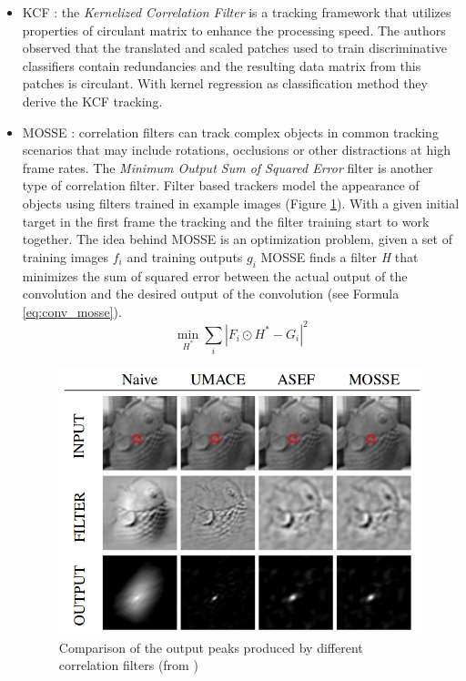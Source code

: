 \begin{itemize}
\item KCF \cite{henriques2012exploiting}: the \textit{Kernelized Correlation Filter} is a tracking framework that utilizes properties of circulant matrix to enhance the processing speed. The authors observed that the translated and scaled patches used to train discriminative classifiers contain redundancies and the resulting data matrix from this patches is circulant. With kernel regression as classification method they derive the KCF tracking.
\item MOSSE \cite{bolme2010visual}: correlation filters can track complex objects in common tracking scenarios that may include rotations, occlusions or other distractions at high frame rates. The \textit{Minimum Output Sum of Squared Error} filter is another type of correlation filter. Filter based trackers model the appearance of objects using filters trained in example images (Figure \ref{fig:mosse}). With a given initial target in the first frame the tracking and the filter training start to work together. The idea behind MOSSE is an optimization problem, given a set of training images $f_i$ and training outputs $g_i$ MOSSE finds a filter \textit{H} that minimizes the sum of squared error between the actual output of the convolution and the desired output of the convolution (see Formula \ref{eq:conv_mosse}).
\begin{equation}
\min_{H^*}\sum_{i}\left|F_i \odot H^* - G_i\right|^2
\label{eq:conv_mosse}
\end{equation}

\begin{figure}[H]
\begin{center}
\includegraphics[scale=0.35]{figures/mosse_filter.png}
\caption{Comparison of the output peaks produced by different correlation filters (from \cite{bolme2010visual})}
\label{fig:mosse}
\end{center}
\end{figure} 


\end{itemize}
